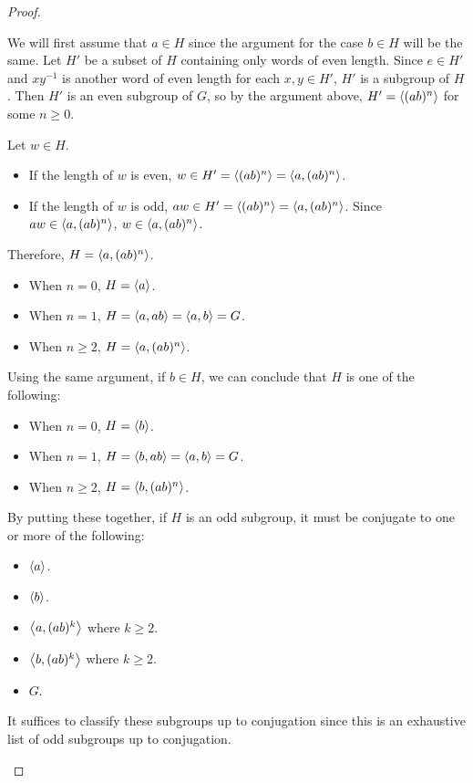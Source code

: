 \documentclass[12pt, psamsfonts]{amsart}
\theoremstyle{definition}
\theoremstyle{remark}
\numberwithin{equation}{section}
\begin{document}
\begin{proof}
\begin{itemize}
      We will first assume that $a \in H$ since the argument for the case $b \in H$ will be the same.
      Let $H'$ be a subset of $H$ containing only words of even length.
      Since $e \in H'$ and $xy^{-1}$ is another word of even length for each $x, y \in H'$, $H'$ is a subgroup of $H$.
      Then $H'$ is an even subgroup of $G$, so by the argument above, $H' = \ev{(ab)^n}$ for some $n \geq 0$.

      Let $w \in H$.
      \begin{itemize}
        \item
          If the length of $w$ is even, $w \in H' = \ev{(ab)^n} = \ev{a, (ab)^n}$.
        \item
          If the length of $w$ is odd, $aw \in H' = \ev{(ab)^n} = \ev{a, (ab)^n}$.
          Since $aw \in \ev{a, (ab)^n}$, $w \in \ev{a, (ab)^n}$.
      \end{itemize}
      Therefore, $H = \ev{a, (ab)^n}$.
      
      \begin{itemize}
        \item
          When $n = 0$, $H = \ev{a}$.
        \item
          When $n = 1$, $H = \ev{a, ab} = \ev{a, b} = G$.
        \item
          When $n \geq 2$, $H = \ev{a, (ab)^n}$.
      \end{itemize}

      Using the same argument, if $b \in H$, we can conclude that $H$ is one of the following:
      \begin{itemize}
        \item
          When $n = 0$, $H = \ev{b}$.
        \item
          When $n = 1$, $H = \ev{b, ab} = \ev{a, b} = G$.
        \item
          When $n \geq 2$, $H = \ev{b, (ab)^n}$.
      \end{itemize}

      By putting these together, if $H$ is an odd subgroup, it must be conjugate to one or more of the following:
      \begin{itemize}
        \item
          $\ev{a}$.
        \item
          $\ev{b}$.
        \item
          $\ev{a, (ab)^k}$ where $k \geq 2$.
        \item
          $\ev{b, (ab)^k}$ where $k \geq 2$.
        \item
          $G$.
      \end{itemize}
      It suffices to classify these subgroups up to conjugation since this is an exhaustive list of odd subgroups up to conjugation.


\end{itemize}
\end{proof}
\end{document}

